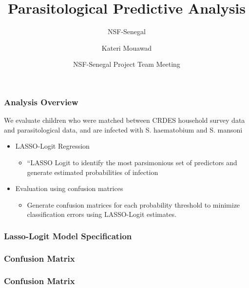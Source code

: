 \documentclass{beamer}
\title[Predictive Analysis] %
{Parasitological Predictive Analysis}
\subtitle{NSF-Senegal}
\author{Kateri Mouawad} %
\date[June 2025] %
{NSF-Senegal Project Team Meeting}
\begin{document}
\frame{\titlepage}

\begin{frame}
\frametitle{Analysis Overview}
We evaluate children who were matched between CRDES household survey data and parasitological data, and are infected with S. haematobium and S. mansoni \\

\begin{itemize}
    \item<1-> LASSO-Logit Regression
       \begin{itemize}
             \item<2-> “LASSO Logit to identify the most parsimonious set of predictors and generate estimated probabilities of infection
        \end{itemize}
    \item<3-> Evaluation using confusion matrices
         \begin{itemize}
                 \item<4-> Generate confusion matrices for each probability threshold to minimize classification errors using LASSO-Logit estimates.
         \end{itemize}
\end{itemize}

\end{frame}


\begin{frame}
\frametitle{Lasso-Logit Model Specification}




\end{frame}

\begin{frame}
\frametitle{Confusion Matrix}





\end{frame}

\begin{frame}
\frametitle{Confusion Matrix}



\end{frame}
\end{document}
